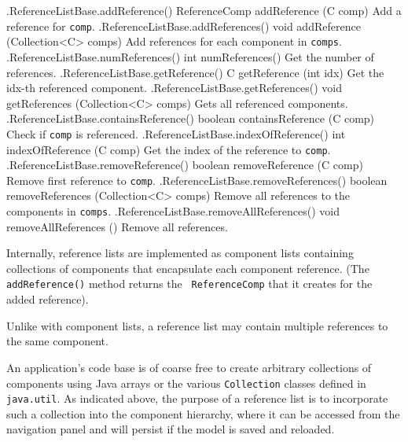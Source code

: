 \begin{methodtable}{0.5}{0.5}
\midline
%
\methodentry
{\mbase.ReferenceListBase.addReference()}%
{ReferenceComp addReference (C comp)}%
{Add a reference for {\tt comp}.}%
%
\methodentry
{\mbase.ReferenceListBase.addReferences()}%
{void addReference (Collection<C> comps)}%
{Add references for each component in {\tt comps}.}%
%
\methodspace{0.5em}%
\methodentry
{\mbase.ReferenceListBase.numReferences()}%
{int numReferences()}%
{Get the number of references.}%
%
\methodentry
{\mbase.ReferenceListBase.getReference()}%
{C getReference (int idx)}%
{Get the idx-th referenced component.}%
%
\methodentry
{\mbase.ReferenceListBase.getReferences()}%
{void getReferences (Collection<C> comps)}%
{Gets all referenced components.}%
%
\methodentry
{\mbase.ReferenceListBase.containsReference()}%
{boolean containsReference (C comp)}%
{Check if {\tt comp} is referenced.}%
%
\methodentry
{\mbase.ReferenceListBase.indexOfReference()}%
{int indexOfReference (C comp)}%
{Get the index of the reference to {\tt comp}.}%
%
\methodspace{0.5em}%
\methodentry
{\mbase.ReferenceListBase.removeReference()}%
{boolean removeReference (C comp)}%
{Remove first reference to {\tt comp}.}%
%
\methodentry
{\mbase.ReferenceListBase.removeReferences()}%
{boolean removeReferences (Collection<C> comps)}%
{Remove all references to the components in {\tt comps}.}%
%
\methodentry
{\mbase.ReferenceListBase.removeAllReferences()}%
{void removeAllReferences ()}%
{Remove all references.}%
%
\midline
\end{methodtable}
%
Internally, reference lists are implemented as component lists containing 
collections of
 components that encapsulate each
component reference.  (The {\tt addReference()} method returns the {\tt
ReferenceComp} that it creates for the added reference).

\begin{sideblock}
Unlike with component lists, a reference list may contain multiple references
to the same component.
\end{sideblock}

\begin{sideblock}
An application's code base is of coarse free to create arbitrary collections of
components using Java arrays or the various {\tt Collection} classes defined in
{\tt java.util}. As indicated above, the purpose of a reference list is to
incorporate such a collection into the component hierarchy, where it can be
accessed from the navigation panel and will persist if the model is saved and
reloaded.
\end{sideblock}

